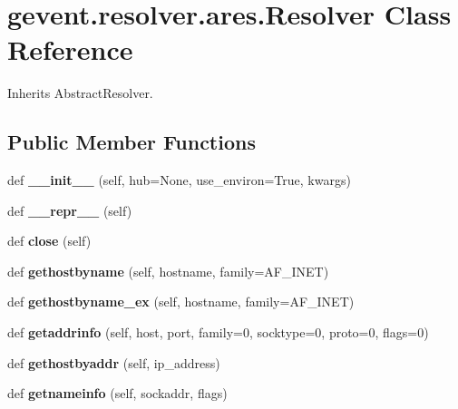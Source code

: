 \hypertarget{classgevent_1_1resolver_1_1ares_1_1_resolver}{}\section{gevent.\+resolver.\+ares.\+Resolver Class Reference}
\label{classgevent_1_1resolver_1_1ares_1_1_resolver}


Inherits Abstract\+Resolver.

\subsection*{Public Member Functions}
\begin{DoxyCompactItemize}
\item 
\mbox{\label{classgevent_1_1resolver_1_1ares_1_1_resolver_a5814af380aeefe99e37768044dafb822}} 
def {\bfseries \+\_\+\+\_\+init\+\_\+\+\_\+} (self, hub=None, use\+\_\+environ=True, kwargs)
\item 
\mbox{\label{classgevent_1_1resolver_1_1ares_1_1_resolver_a944bb5494f42b7799e8e90f06e6e7d36}} 
def {\bfseries \+\_\+\+\_\+repr\+\_\+\+\_\+} (self)
\item 
\mbox{\label{classgevent_1_1resolver_1_1ares_1_1_resolver_a2bf4f4e89a326f56544b2739b8b40177}} 
def {\bfseries close} (self)
\item 
\mbox{\label{classgevent_1_1resolver_1_1ares_1_1_resolver_a58b0670af1981218c7c50ceb3e25af63}} 
def {\bfseries gethostbyname} (self, hostname, family=A\+F\+\_\+\+I\+N\+ET)
\item 
\mbox{\label{classgevent_1_1resolver_1_1ares_1_1_resolver_a1317415ae97b62cc3655fbb2a0693e4c}} 
def {\bfseries gethostbyname\+\_\+ex} (self, hostname, family=A\+F\+\_\+\+I\+N\+ET)
\item 
\mbox{\label{classgevent_1_1resolver_1_1ares_1_1_resolver_ae723587e02c6d10d5ad9451640845073}} 
def {\bfseries getaddrinfo} (self, host, port, family=0, socktype=0, proto=0, flags=0)
\item 
\mbox{\label{classgevent_1_1resolver_1_1ares_1_1_resolver_a78af6231bb6660526ac82d978e09db69}} 
def {\bfseries gethostbyaddr} (self, ip\+\_\+address)
\item 
\mbox{\label{classgevent_1_1resolver_1_1ares_1_1_resolver_ab02e6a425119b37de86876e95356efa2}} 
def {\bfseries getnameinfo} (self, sockaddr, flags)
\end{DoxyCompactItemize}

